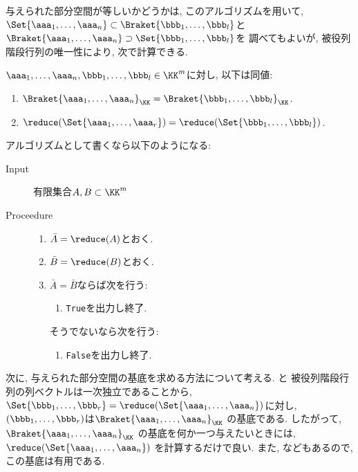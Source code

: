 与えられた部分空間が等しいかどうかは,
このアルゴリズムを用いて,
$\Set{\aaa_1,\ldots,\aaa_n}\subset \Braket{\bbb_1,\ldots,\bbb_l}$と
$\Braket{\aaa_1,\ldots,\aaa_n}\supset \Set{\bbb_1,\ldots,\bbb_l}$を
調べてもよいが,
被役列階段行列の唯一性により, 次で計算できる.
\begin{prop}
  \label{prop:reducedech:subspace:eq:criterion}
  $\aaa_1,\ldots,\aaa_n,\bbb_1,\ldots,\bbb_l\in\KK^m$に対し,
  以下は同値:
  \begin{enumerate}
  \item $\Braket{\aaa_1,\ldots,\aaa_n}_{\KK}=\Braket{\bbb_1,\ldots,\bbb_l}_{\KK}$.
  \item $\reduce(\Set{\aaa_1,\ldots,\aaa_r})=\reduce(\Set{\bbb_1,\ldots,\bbb_l})$.
  \end{enumerate}
\end{prop}
アルゴリズムとして書くなら以下のようになる:
\begin{algorithm}\makebox{}
\begin{description}
\item[Input]
  有限集合$A,B\subset \KK^m$
\item[Proceedure]\makebox{}
  \begin{enumerate}
  \item $\bar A=\reduce(A)$とおく.
  \item $\bar B=\reduce(B)$とおく.
  \item $\bar A=\bar B$ならば次を行う:
    \begin{enumerate}
    \item \texttt{True}を出力し終了.
    \end{enumerate}
  そうでないなら次を行う:
    \begin{enumerate}
    \item \texttt{False}を出力し終了.
    \end{enumerate}
  \end{enumerate}
\end{description}
\end{algorithm}


次に, 与えられた部分空間の基底を求める方法について考える.
と
被役列階段行列の列ベクトルは一次独立であることから,
$\Set{\bbb_1,\ldots,\bbb_r}=\reduce(\Set{\aaa_1,\ldots,\aaa_n})$に対し,
$(\bbb_1,\ldots,\bbb_r)$は$\Braket{\aaa_1,\ldots,\aaa_n}_{\KK}$
の基底である.
したがって,
$\Braket{\aaa_1,\ldots,\aaa_n}_{\KK}$
の基底を何か一つ与えたいときには,
$\reduce(\Set{\aaa_1,\ldots,\aaa_n})$
を計算するだけで良い.
また, などもあるので,
この基底は有用である.

